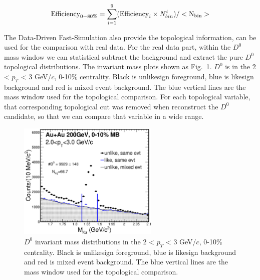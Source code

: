 \begin{equation}
  \textup{Efficiency}_{0-80\%} = \sum_{i=1}^{9}(\textup{Efficiency}_{i} \times N_{bin}^{i}) / <\textup{N}_{\textup{bin}}>
\label{effcombine}
\end{equation}

The Data-Driven Fast-Simulation also provide the topological information, can be used for the comparison with real data. For the real data part, within the $D^0$ mass window we can statistical subtract the background and extract the pure $D^0$ topological distributions. The invariant mass plots shown as Fig.~\ref{d0massforTopo}. $D^0$ is in the 2 < $p_T$ < 3 GeV/$c$, 0-10\% centrality. Black is unlikesign foreground, blue is likesign background and red is mixed event background. The blue vertical lines are the mass window used for the topological comparison. For each topological variable, that corresponding topological cut was removed when reconstruct the $D^0$ candidate, so that we can compare that variable in a wide range.

\begin{figure}[htbp]
\centering
\includegraphics[keepaspectratio,width=0.6\textwidth]{figure/Run14_D0HFT/Mixed_cent_8_9_pt_2_3.eps}
\caption{$D^0$ invariant mass distributions in the 2 < $p_T$ < 3 GeV/$c$, 0-10\% centrality. Black is unlikesign foreground, blue is likesign background and red is mixed event background. The blue vertical lines are the mass window used for the topological comparison.}
\label{d0massforTopo}
\end{figure}

